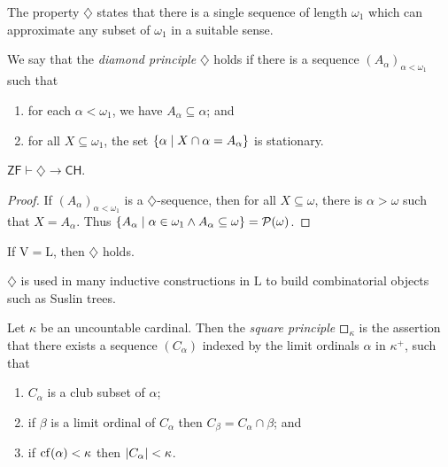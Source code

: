 The property \( \diamondsuit \) states that there is a single sequence of length \( \omega_1 \) which can approximate any subset of \( \omega_1 \) in a suitable sense.
\begin{definition}
    We say that the \emph{diamond principle} \( \diamondsuit \) holds if there is a sequence \( (A_\alpha)_{\alpha < \omega_1} \) such that
    \begin{enumerate}
        \item for each \( \alpha < \omega_1 \), we have \( A_\alpha \subseteq \alpha \); and
        \item for all \( X \subseteq \omega_1 \), the set \( \qty{\alpha \mid X \cap \alpha = A_\alpha} \) is stationary.
    \end{enumerate}
\end{definition}
\begin{lemma}
    \( \mathsf{ZF} \vdash \diamondsuit \to \mathsf{CH} \).
\end{lemma}
\begin{proof}
    If \( (A_\alpha)_{\alpha < \omega_1} \) is a \( \diamondsuit \)-sequence, then for all \( X \subseteq \omega \), there is \( \alpha > \omega \) such that \( X = A_\alpha \).
    Thus \( \qty{A_\alpha \mid \alpha \in \omega_1 \wedge A_\alpha \subseteq \omega} = \mathcal P(\omega) \).
\end{proof}
\begin{theorem}
    If \( \mathrm{V} = \mathrm{L} \), then \( \diamondsuit \) holds.
\end{theorem}
\begin{remark}
    \( \diamondsuit \) is used in many inductive constructions in \( \mathrm{L} \) to build combinatorial objects such as Suslin trees.
\end{remark}
\begin{definition}
    Let \( \kappa \) be an uncountable cardinal.
    Then the \emph{square principle} \( \mdwhtsquare_\kappa \) is the assertion that there exists a sequence \( (C_\alpha) \) indexed by the limit ordinals \( \alpha \) in \( \kappa^+ \), such that
    \begin{enumerate}
        \item \( C_\alpha \) is a club subset of \( \alpha \);
        \item if \( \beta \) is a limit ordinal of \( C_\alpha \) then \( C_\beta = C_\alpha \cap \beta \); and
        \item if \( \operatorname{cf}(\alpha) < \kappa \) then \( \abs{C_\alpha} < \kappa \).
    \end{enumerate}
\end{definition}
